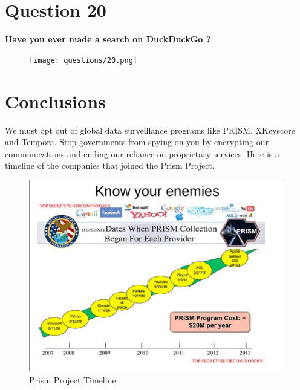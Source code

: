 \documentclass[11pt]{book}
\begin{document}
\newpage
\chapter{Question 20}
\textbf{Have you ever made a search on DuckDuckGo ?
}
\begin{figure}[ht!]
	\centering
	\texttt{[image: questions/20.png]}
	\label{overflow}
\end{figure}

\newpage
\chapter{Conclusions}
We must opt out of global data surveillance programs like PRISM, XKeyscore and Tempora. Stop governments from spying on you by encrypting our communications and ending our reliance on proprietary services.
Here is a timeline of the companies that joined the Prism Project.
\begin{figure}[ht!]
	\centering
	\includegraphics[width=150mm]{prism1.png}
	\caption{Prism Project Timeline}
	\label{overflow}
\end{figure}
\newpage
\end{document}
